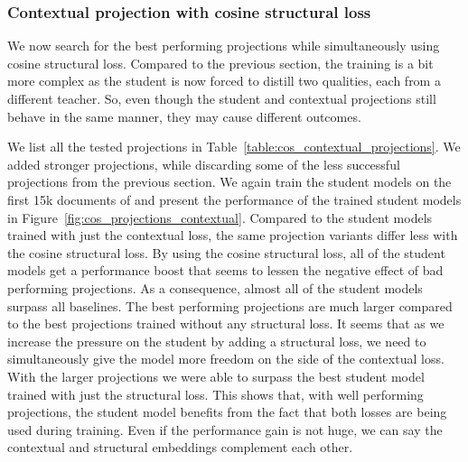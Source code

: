 \subsubsection{Contextual projection with cosine structural loss}

We now search for the best performing projections while simultaneously using
cosine structural loss. Compared to the previous section, the training is a bit
more complex as the student is now forced to distill two qualities, each from a
different teacher. So, even though the student and contextual
projections still behave in the same manner, they may cause different outcomes.

We list all the tested projections in
Table~\ref{table:cos_contextual_projections}. We added stronger projections,
while discarding some of the less successful projections from the previous
section. We again train the student models on the first 15k documents of
 and present the performance of the trained student models
in Figure~\ref{fig:cos_projections_contextual}. Compared to the student models
trained with just the contextual loss, the same projection variants differ less
with the cosine structural loss. By using the cosine structural loss, all of
the student models get a performance boost that seems to lessen the negative
effect of bad performing projections. As a consequence, almost all of the
student models surpass all baselines. The best performing projections are much
larger compared to the best projections trained without any structural loss. It
seems that as we increase the pressure on the student by adding a structural
loss, we need to simultaneously give the model more freedom on the side of the
contextual loss. With the larger projections we were able to surpass the best
student model trained with just the structural loss. This shows that, with well
performing projections, the student model benefits from the fact that both
losses are being used during training. Even if the performance gain is not
huge, we can say the contextual and structural embeddings complement each
other.

